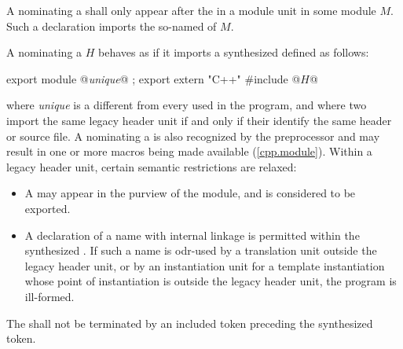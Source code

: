 \begin{std.txt}
  \begin{after}\color{addclr}
  \alinea
  A  nominating
  a  shall only appear after
  the  in a module unit in
  some module $M$.
  Such a declaration imports the so-named
   of $M$.

  \color{addclr}
  \alinea
  A  nominating
  a  $H$ behaves as if it imports
  a synthesized  defined as follows:

  \begin{codeblock}\color{addclr}
  export module @\textit{unique}@ ;
  export extern "C++" {
  #include @$H$@
  }
  \end{codeblock}

  where \textit{unique} is a 
  different from every 
  used in the program, and where two
  import the same legacy header unit if and only if
  their  identify the same
  header or source file.
  \enternote
  A  nominating
  a  is also recognized by the
  preprocessor and may result in one or more macros being
  made available (\ref{cpp.module}).
  \exitnote
  Within a legacy header unit, certain semantic restrictions
  are relaxed:
  \begin{itemize}
  \item A  may appear
  in the purview of the module, and is considered to be exported.
  \item A declaration of a name with internal linkage is
  permitted within the synthesized
  . If such a name is
  odr-used by a translation unit outside the legacy
  header unit, or by an instantiation unit for a template
  instantiation whose point of instantiation is outside
  the legacy header unit, the program is ill-formed.
  \end{itemize}
  The  shall not be
  terminated by an included \tcode{\}} token preceding
  the synthesized \tcode{\}} token.
  \end{after}


\end{std.txt}
